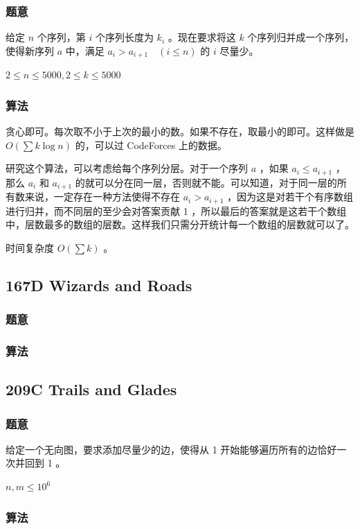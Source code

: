 \documentclass[11pt]{article}
\begin{document}
\subsubsection{题意}
\label{sec-12-1-1}

给定 $n$ 个序列，第 $i$ 个序列长度为 $k_i$ 。现在要求将这 $k$ 个序列归并成一个序列，使得新序列 $a$ 中，满足 $a_i > a_{i + 1} \quad (i \leq n)$ 的 $i$ 尽量少。

$2 \leq n \leq 5000, 2 \leq k \leq 5000$
\subsubsection{算法}
\label{sec-12-1-2}

贪心即可。每次取不小于上次的最小的数。如果不存在，取最小的即可。这样做是 $O(\sum k \log n)$ 的，可以过 CodeForces 上的数据。

研究这个算法，可以考虑给每个序列分层。对于一个序列 $a$ ，如果 $a_i \leq a_{i + 1}$ ，那么 $a_i$ 和 $a_{i + 1}$ 的就可以分在同一层，否则就不能。可以知道，对于同一层的所有数来说，一定存在一种方法使得不存在 $a_i > a_{i + 1}$ ，因为这是对若干个有序数组进行归并，而不同层的至少会对答案贡献 1 ，所以最后的答案就是这若干个数组中，层数最多的数组的层数。这样我们只需分开统计每一个数组的层数就可以了。

时间复杂度 $O(\sum k)$ 。
\subsection{167D  Wizards and Roads}
\label{sec-12-2}
\subsubsection{题意}
\label{sec-12-2-1}
\subsubsection{算法}
\label{sec-12-2-2}
\subsection{209C  Trails and Glades}
\label{sec-12-3}
\subsubsection{题意}
\label{sec-12-3-1}

    给定一个无向图，要求添加尽量少的边，使得从 1 开始能够遍历所有的边恰好一次并回到 1 。

    $n, m \leq 10^6$
\subsubsection{算法}
\label{sec-12-3-2}
\end{document}
